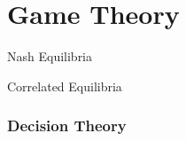 \part{Game Theory}\label{sec:game_theory}

Nash Equilibria

Correlated Equilibria



\section{Decision Theory}\label{sec:decision_theory}
